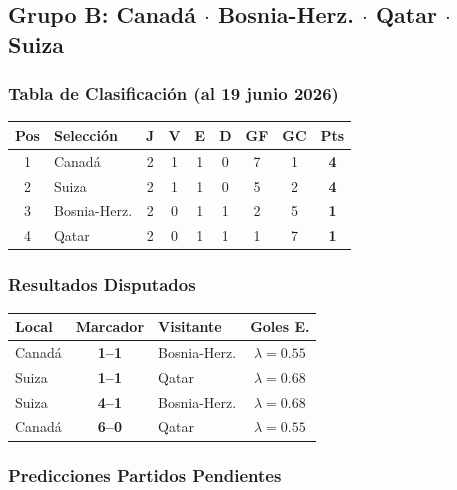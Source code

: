 \documentclass[11pt,a4paper]{article}
\begin{document}
\subsection{Grupo B: Canadá $\cdot$ Bosnia-Herz. $\cdot$ Qatar $\cdot$ Suiza}

\subsubsection*{Tabla de Clasificación (al 19 junio 2026)}


\begin{center}
\begin{tabular}{@{}clccccccc@{}}
\toprule
\textbf{Pos} & \textbf{Selección} & \textbf{J} & \textbf{V} & \textbf{E} & \textbf{D} & \textbf{GF} & \textbf{GC} & \textbf{Pts} \\
\midrule
  \cellcolor{green!25}1 & \cellcolor{green!25}Canadá & 2 & 1 & 1 & 0 & 7 & 1 & \textbf{4} \\
  \cellcolor{green!25}2 & \cellcolor{green!25}Suiza & 2 & 1 & 1 & 0 & 5 & 2 & \textbf{4} \\
  \cellcolor{yellow!20}3 & \cellcolor{yellow!20}Bosnia-Herz. & 2 & 0 & 1 & 1 & 2 & 5 & \textbf{1} \\
  4 & Qatar & 2 & 0 & 1 & 1 & 1 & 7 & \textbf{1} \\
\bottomrule
\end{tabular}
\end{center}

\subsubsection*{Resultados Disputados}

\begin{center}
\begin{tabular}{@{}lclc@{}}
\toprule
\textbf{Local} & \textbf{Marcador} & \textbf{Visitante} & \textbf{Goles E.} \\
\midrule
  Canadá & \textbf{1--1} & Bosnia-Herz. & $\lambda=0.55$ \\
  Suiza & \textbf{1--1} & Qatar & $\lambda=0.68$ \\
  Suiza & \textbf{4--1} & Bosnia-Herz. & $\lambda=0.68$ \\
  Canadá & \textbf{6--0} & Qatar & $\lambda=0.55$ \\
\bottomrule
\end{tabular}
\end{center}

\subsubsection*{Predicciones Partidos Pendientes}
\end{document}
